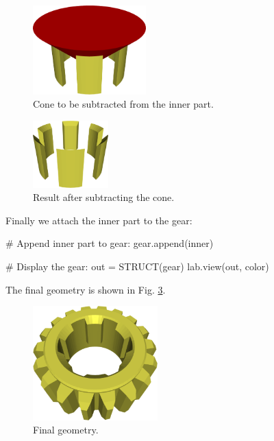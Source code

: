 \begin{figure}[!ht]
\begin{center}
\includegraphics[width=0.39\textwidth]{img/gear-10.png}
\end{center}
\vspace{-4mm}
\caption{Cone to be subtracted from the inner part.}
\label{fig:gear-10}
\end{figure}
\noindent

\begin{figure}[!ht]
\begin{center}
\includegraphics[width=0.26\textwidth]{img/gear-12.png}
\end{center}
\vspace{-4mm}
\caption{Result after subtracting the cone.}
\label{fig:gear-12}
\end{figure}
\newpage
\noindent
Finally we attach the inner part to the gear:

{\small
\begin{bluecode}
# Append inner part to gear:
gear.append(inner)

# Display the gear:
out = STRUCT(gear)
lab.view(out, color)
\end{bluecode}
}
\noindent
The final geometry is shown in Fig. \ref{fig:gear-last}.

\begin{figure}[!ht]
\begin{center}
\includegraphics[width=0.43\textwidth]{img/gear-last.png}
\end{center}
\vspace{-4mm}
\caption{Final geometry.}
\label{fig:gear-last}
\end{figure}
\noindent


